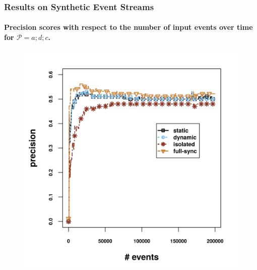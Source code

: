 \begin{frame}
	
	\frametitle{Results on Synthetic Event Streams }
	\framesubtitle{Precision scores with respect to the number of input events over time for $\mathcal{P}=a;d;c$.}
	
	\begin{figure}[H]
		\centering
		\includegraphics[width=.9\textwidth,height=.8\textheight]{../chapters/figures/synthetic/new/precision_synthetic.png}
		
	\end{figure}
	
\end{frame}


